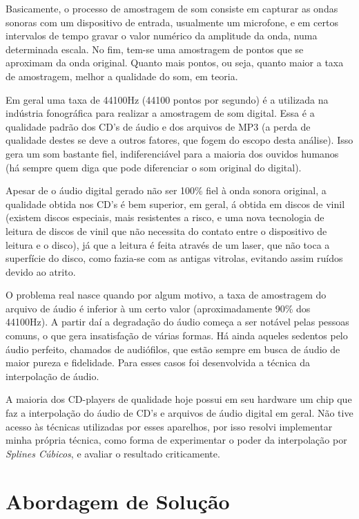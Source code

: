 Basicamente, o processo de amostragem de som consiste em capturar as ondas sonoras com um dispositivo de entrada, usualmente um microfone, e em certos intervalos de tempo gravar o valor numérico da amplitude da onda, numa determinada escala. No fim, tem-se uma amostragem de pontos que se aproximam da onda original. Quanto mais pontos, ou seja, quanto maior a taxa de amostragem, melhor a qualidade do som, em teoria.

Em geral uma taxa de 44100Hz (44100 pontos por segundo) é a utilizada na indústria fonográfica para realizar a amostragem de som digital. Essa é a qualidade padrão dos CD's de áudio e dos arquivos de MP3 (a perda de qualidade destes se deve a outros fatores, que fogem do escopo desta análise). Isso gera um som bastante fiel, indiferenciável para a maioria dos ouvidos humanos (há sempre quem diga que pode diferenciar o som original do digital).

Apesar de o áudio digital gerado não ser 100\% fiel à onda sonora original, a qualidade obtida nos CD's é bem superior, em geral, á obtida em discos de vinil (existem discos especiais, mais resistentes a risco, e uma nova tecnologia de leitura de discos de vinil que não necessita do contato entre o dispositivo de leitura e o disco), já que a leitura é feita através de um laser, que não toca a superfície do disco, como fazia-se com as antigas vitrolas, evitando assim ruídos devido ao atrito.

O problema real nasce quando por algum motivo, a taxa de amostragem do arquivo de áudio é inferior à um certo valor (aproximadamente 90\% dos 44100Hz). A partir daí a degradação do áudio começa a ser notável pelas pessoas comuns, o que gera insatisfação de várias formas. Há ainda aqueles sedentos pelo áudio perfeito, chamados de audiófilos, que estão sempre em busca de áudio de maior pureza e fidelidade. Para esses casos foi desenvolvida a técnica da interpolação de áudio.

A maioria dos CD-players de qualidade hoje possui em seu hardware um chip que faz a interpolação do áudio de CD's e arquivos de áudio digital em geral. Não tive acesso às técnicas utilizadas por esses aparelhos, por isso resolvi implementar minha própria técnica, como forma de experimentar o poder da interpolação por \textit{Splines Cúbicos}, e avaliar o resultado criticamente.

\section{Abordagem de Solução}

